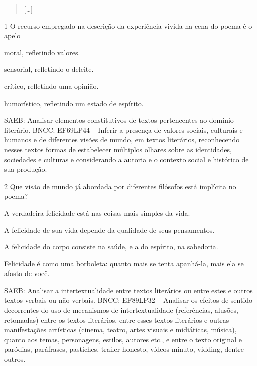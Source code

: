 \begin{quote}
{[}\ldots{]}
\end{quote}


\num{1} O recurso empregado na descrição da experiência vivida na cena
do poema é o apelo

\begin{escolha}
\item moral, refletindo valores.

\item sensorial, refletindo o deleite.

\item crítico, refletindo uma opinião.

\item humorístico, refletindo um estado de espírito.
\end{escolha}

SAEB: Analisar elementos constitutivos de textos pertencentes ao domínio
literário. BNCC: EF69LP44 -- Inferir a presença de valores sociais,
culturais e humanos e de diferentes visões de mundo, em textos
literários, reconhecendo nesses textos formas de estabelecer múltiplos
olhares sobre as identidades, sociedades e culturas e considerando a
autoria e o contexto social e histórico de sua produção.

\num{2} Que visão de mundo já abordada por diferentes filósofos está
implícita no poema?

\begin{escolha}
\item A verdadeira felicidade está nas coisas mais simples da vida.

\item A felicidade de sua vida depende da qualidade de seus pensamentos.

\item A felicidade do corpo consiste na saúde, e a do espírito, na
sabedoria.

\item Felicidade é como uma borboleta: quanto mais se tenta apanhá-la, mais
ela se afasta de você.
\end{escolha}

SAEB: Analisar a intertextualidade entre textos literários ou entre
estes e outros textos verbais ou não verbais. BNCC: EF89LP32 -- Analisar
os efeitos de sentido decorrentes do uso de mecanismos de
intertextualidade (referências, alusões, retomadas) entre os textos
literários, entre esses textos literários e outras manifestações
artísticas (cinema, teatro, artes visuais e midiáticas, música), quanto
aos temas, personagens, estilos, autores etc., e entre o texto original
e paródias, paráfrases, pastiches, trailer honesto, vídeos-minuto,
vidding, dentre outros.

